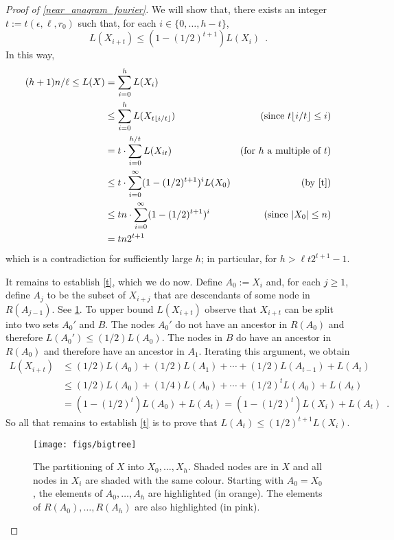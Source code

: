 \documentclass{patmorin}
\begin{document}
\begin{proof}[Proof of \cref{near_anagram_fourier}]
  We will show that, there exists an integer $t:=t(\epsilon,\ell,r_0)$ such that, for each $i\in\{0,\ldots,h-t\}$,
  \begin{equation}
     L(X_{i+t}) \le (1-(1/2)^{t+1}) L(X_i) \enspace . \label{t}
  \end{equation}
  In this way,
  \begin{align*}
     (h+1)n/\ell
        \le L(X) & = \sum_{i=0}^{h} L(X_i) \\
           &\le \sum_{i=0}^{h} L(X_{t\floor{i/t}})
             & \text{(since $t\floor{i/t}\le i$)} \\
           & = t\cdot\sum_{i=0}^{h/t} L(X_{it})
             & \text{(for $h$ a multiple of $t$)} \\
           &\le t\cdot\sum_{i=0}^{\infty} (1-(1/2)^{t+1})^i L(X_0)
           & \text{(by \cref{t})}\\
           &\le tn\cdot \sum_{i=0}^{\infty} (1-(1/2)^{t+1})^i
           & \text{(since $|X_0|\le n$)} \\
           & = tn2^{t+1} \\
  \end{align*}
  which is a contradiction for sufficiently large $h$; in particular, for $h > \ell t2^{t+1}-1$.

  It remains to establish \cref{t}, which we do now.  Define $A_0:= X_i$ and, for each $j\ge 1$, define $A_j$ to be the subset of $X_{i+j}$ that are descendants of some node in $R(A_{j-1})$.  See \cref{bigtree}.  To upper bound $L(X_{i+t})$ observe that $X_{i+t}$ can be split into two sets $A_0'$ and $B$.  The nodes $A_0'$ do not have an ancestor in $R(A_0)$ and therefore $L(A_0')\le (1/2)L(A_0)$. The nodes in $B$ do have an ancestor in $R(A_0)$ and therefore have an ancestor in $A_1$.  Iterating this argument, we obtain
 \begin{align*}
      L(X_{i+t})
         &\le (1/2)L(A_0) + (1/2)L(A_1) + \cdots + (1/2)L(A_{t-1}) + L(A_t) \\
         &\le (1/2)L(A_0) + (1/4)L(A_0) + \cdots + (1/2)^t L(A_{0}) + L(A_t) \\
         &  = (1-(1/2)^t)L(A_0) + L(A_t) = (1-(1/2)^t)L(X_i) + L(A_t)  \enspace .
   \end{align*}
  So all that remains to establish \eqref{t} is to prove that
  $L(A_t)\le (1/2)^{t+1}L(X_i)$.

  \begin{figure}
    \begin{center}
       \texttt{[image: figs/bigtree]}
    \end{center}
    \caption{The partitioning of $X$ into $X_0,\ldots,X_h$. Shaded
    nodes are in $X$ and all nodes in $X_i$ are shaded with the same
    colour.   Starting with $A_0=X_0$, the elements of $A_0,\ldots,A_h$
    are highlighted (in orange).  The elements of $R(A_0),\ldots,R(A_h)$ are also highlighted (in pink).}
    \label{bigtree}
  \end{figure}


\end{proof}
\end{document}
